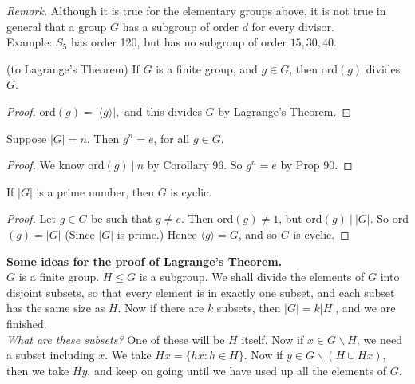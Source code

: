 \noindent \textit{Remark.} Although it is true for the elementary groups above, it is not true in general that a group $G$ has a subgroup of order $d$ for every divisor.\\
 Example: $S_5$ has order 120, but has no subgroup of order $15,30,40$.\\
 
 
\begin{corollary} (to Lagrange's Theorem) If $G$ is a finite group, and $g \in G$, then ord$(g)$ divides $G$.	
\end{corollary}


\begin{proof}
ord$(g) = |\langle g \rangle|,$ and this divides $G$ by Lagrange's Theorem.	
\end{proof}\vspace*{10pt}

\begin{corollary}Suppose $|G| = n$. Then $g^n = e$, for all $g \in G.$	
\end{corollary}

\begin{proof}
We know ord$(g) ~|~ n$ by Corollary 96. So $g^n = e$ by Prop 90.
\end{proof}\vspace*{10pt}

\begin{corollary} If $|G|$ is a prime number, then $G$ is cyclic.	
\end{corollary}

\begin{proof}
Let $g \in G$ be such that $g \neq e$. Then ord$(g)\neq 1$, but ord$(g) ~|~ |G|$. So ord$(g) = |G|$ (Since $|G|$ is prime.)	Hence $\langle g \rangle = G$, and so $G$ is cyclic.
\end{proof}\vspace*{15pt}


\textbf{Some ideas for the proof of Lagrange's Theorem.}\\

$G$ is a finite group. $H \leq G$ is a subgroup. We shall divide the elements of $G$ into disjoint subsets, so that every element is in exactly one subset, and each subset has the same size as $H$. Now if there are $k$ subsets, then $|G| = k|H|$, and we are finished.\\

\textit{What are these subsets?} One of these will be $H$ itself. Now if $x \in G\backslash H$, we need a subset including $x$. We take $Hx = \{hx : h \in H\}$. Now if $y \in G \backslash(H \cup Hx)$, then we take $Hy$, and keep on going until we have used up all the elements of $G$.\\

